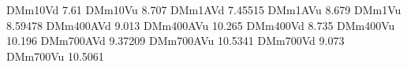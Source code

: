 DMm10Vd 7.61
DMm10Vu 8.707
DMm1AVd 7.45515
DMm1AVu 8.679
DMm1Vu 8.59478
DMm400AVd 9.013
DMm400AVu 10.265
DMm400Vd 8.735
DMm400Vu 10.196
DMm700AVd 9.37209
DMm700AVu 10.5341
DMm700Vd 9.073
DMm700Vu 10.5061
